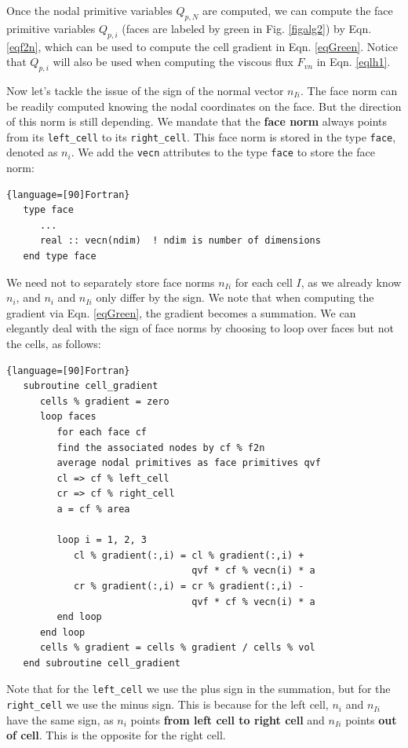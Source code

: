 \documentclass[12pt, letterpaper]{report}
\begin{document}
Once the nodal primitive variables $Q_{p,N}$ are computed, we can compute the face primitive
variables $Q_{p,i}$ (faces are labeled by green in Fig. \ref{figalg2}) by Eqn. \ref{eqf2n}, which
can be used to compute the cell gradient in Eqn. \ref{eqGreen}. Notice that $Q_{p,i}$ will also be
used when computing the viscous flux $F_{vn}$ in Eqn. \ref{eqlh1}. \paraspace

Now let's tackle the issue of the sign of the normal vector $n_{Ii}$. The face norm can be readily
computed knowing the nodal coordinates on the face. But the direction of this norm is still
depending. We mandate that the {\bf face norm} always points from its \verb+left_cell+ to its
\verb+right_cell+. This face norm is stored in the type \verb+face+, denoted as $n_i$. We add the
\verb+vecn+ attributes to the type \verb+face+ to store the face norm:

\begin{lstlisting}{language=[90]Fortran}
   type face
      ...
      real :: vecn(ndim)  ! ndim is number of dimensions
   end type face
\end{lstlisting}

We need not to separately store face norms $n_{Ii}$ for each cell $I$, as we already know $n_i$, and
$n_i$ and $n_{Ii}$ only differ by the sign. We note that when computing the gradient via Eqn.
\ref{eqGreen}, the gradient becomes a summation. We can elegantly deal with the sign of face norms
by choosing to loop over faces but not the cells, as follows:

\begin{lstlisting}{language=[90]Fortran}
   subroutine cell_gradient
      cells % gradient = zero
      loop faces
         for each face cf
         find the associated nodes by cf % f2n
         average nodal primitives as face primitives qvf
         cl => cf % left_cell
         cr => cf % right_cell
         a = cf % area
         
         loop i = 1, 2, 3
            cl % gradient(:,i) = cl % gradient(:,i) + 
                                 qvf * cf % vecn(i) * a
            cr % gradient(:,i) = cr % gradient(:,i) - 
                                 qvf * cf % vecn(i) * a
         end loop
      end loop
      cells % gradient = cells % gradient / cells % vol
   end subroutine cell_gradient
\end{lstlisting}

Note that for the \verb+left_cell+ we use the plus sign in the summation, but for the
\verb+right_cell+ we use the minus sign. This is because for the left cell, $n_i$ and $n_{Ii}$ have
the same sign, as $n_i$ points {\bf from left cell to right cell} and $n_{Ii}$ points {\bf out of
cell}. This is the opposite for the right cell. \paraspace
\end{document}
